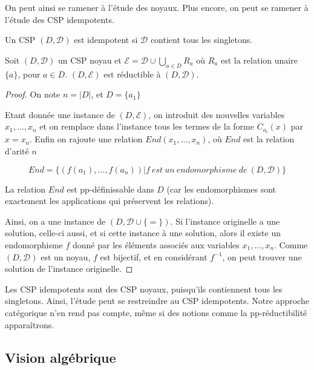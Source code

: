 On peut ainsi se ramener à l'étude des noyaux. Plus encore, on peut se ramener à l'étude des CSP idempotents.

\begin{defi}
Un CSP $(D,\mathcal{D})$ est idempotent si $\mathcal{D}$ contient tous les singletons.
\end{defi}

\begin{theo}
Soit $(D,\mathcal{D})$ un CSP noyau et $\mathcal{E} = \mathcal{D} \cup \bigcup_{a \in D} R_a$ où $R_a$ est la relation unaire $\{a\}$, pour $a \in D$. $(D,\mathcal{E})$ est réductible à $(D,\mathcal{D})$.
\end{theo}

\begin{proof}
On note $n=|D| $, et $D=\{a_1\}$

Etant donnée une instance de $(D,\mathcal{E})$, on introduit des nouvelles variables $x_1,\dots,x_n$ et on remplace dans l'instance tous les termes de la forme $C_{a_i}(x)$ par $x=x_a$. Enfin on rajoute une relation $End(x_1,\dots,x_n)$, où $End$ est la relation d'arité $n$ 

$$ End = \{(f(a_1),\dots,f(a_n))| f\ est\ un\ endomorphisme\ de\ (D,\mathcal{D})\}$$

La relation $End$ est pp-définissable dans $D$ (car les endomorphismes sont exactement les applications qui préservent les relations). 

Ainsi, on a une instance de $(D,\mathcal{D} \cup \{=\})$. Si l'instance originelle a une solution, celle-ci aussi, et si cette instance à une solution, alors il existe un endomorphisme $f$ donné par les éléments associés aux variables $x_1,\dots,x_n$. Comme $(D,\mathcal{D})$ est un noyau, $f$ est bijectif, et en considérant $f^{-1}$, on peut trouver une solution de l'instance originelle.
\end{proof}

Les CSP idempotents sont des CSP noyaux, puisqu'ils contiennent tous les singletons. Ainsi, l'étude peut se restreindre au CSP idempotents. Notre approche catégorique n'en rend pas compte, même si des notions comme la pp-réductibilité apparaîtrons.

\subsection{Vision algébrique}

